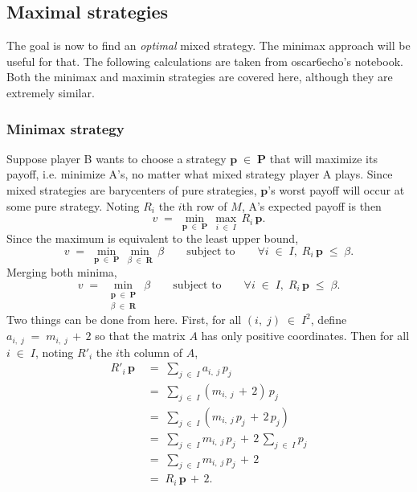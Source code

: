 \documentclass{report}
\theoremstyle{definition}
\theoremstyle{plain}
\begin{document}
\subsection{Maximal strategies}
The goal is now to find an \emph{optimal} mixed strategy. The minimax approach
will be useful for that. The following calculations are taken from oscar6echo's
notebook\cite{oscar6echo}. Both the minimax and maximin strategies are covered
here, although they are extremely similar.

\subsubsection{Minimax strategy}
Suppose player B wants to choose a strategy $\mathbf p\;\in\;\mathbf P$ that will
maximize its payoff, i.e. minimize A's, no matter what mixed strategy player A
plays. Since mixed strategies are barycenters of pure strategies, $\mathbf p$'s
worst payoff will occur at some pure strategy. Noting $R_i$ the $i$th row of
$M$, A's expected payoff is then
\[v\;=\;\min_{\mathbf p\;\in\;\mathbf P}\,\max_{i\;\in\;I}\,R_i\,\mathbf p.\]
Since the maximum is equivalent to the least upper bound,
\[
	v\;=\;\min_{\mathbf p\;\in\;\mathbf P}\,
		\min_{\beta\;\in\;\mathbf R}\,\beta
		\qquad\text{subject to}\qquad
		\forall i\;\in\;I,\;R_i\,\mathbf p\;\leqslant\;\beta.
\]
Merging both minima,
\begin{equation}
	v\;=\;\min_{\substack{\mathbf p\;\in\;\mathbf P\\\beta\;\in\;\mathbf R}}\,\beta
		\qquad\text{subject to}\qquad
		\forall i\;\in\;I,\;R_i\,\mathbf p\;\leqslant\;\beta.
	\label{eqn:minimax_1}
\end{equation}
Two things can be done from here. First, for all $\left(i,\;j\right)\;\in\;I^2$,
define $a_{i,\;j}\;=\;m_{i,\;j}\,+\,2$ so that the matrix $A$ has only positive
coordinates. Then for all $i\;\in\;I$, noting $R'_i$ the $i$th column of $A$,
\begin{align*}
	R'_i\,\mathbf p\;&=\;\sum_{j\;\in\;I}a_{i,\;j}\,p_j \\
		&=\;\sum_{j\;\in\;I}\left(m_{i,\;j}\,+\,2\right)\,p_j \\
		&=\;\sum_{j\;\in\;I}\left(m_{i,\;j}\,p_j\,+\,2\,p_j\right) \\
		&=\;\sum_{j\;\in\;I}m_{i,\;j}\,p_j\,+\,2\,\sum_{j\;\in\;I}p_j \\
		&=\;\sum_{j\;\in\;I}m_{i,\;j}\,p_j\,+\,2 \\
		&=\;R_i\,\mathbf p\,+\,2.
\end{align*}
\end{document}
